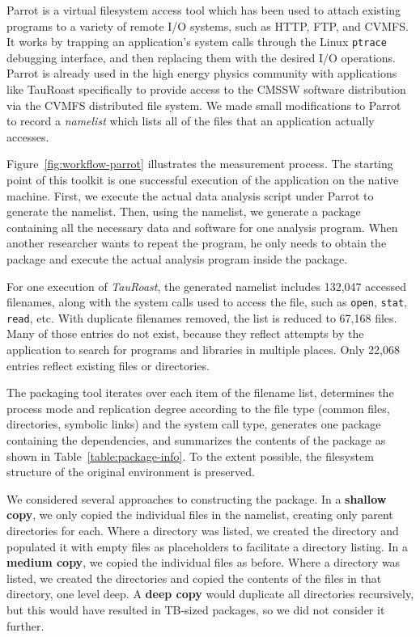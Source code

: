 \documentclass{sig-alternate}
\begin{document}
Parrot is a virtual filesystem access tool which has been used to attach
existing programs to a variety of remote I/O systems, such as HTTP, FTP, and CVMFS.
It works by trapping an application's system calls through the Linux {\tt ptrace} debugging
interface, and then replacing them with the desired I/O operations.  Parrot is already used
in the high energy physics community with applications like TauRoast specifically to 
provide access to the CMSSW software distribution via the CVMFS distributed file system.
We made small modifications to Parrot to record a \emph{namelist} which lists all 
of the files that an application actually accesses.

Figure~\ref{fig:workflow-parrot} illustrates the measurement process.
The starting point of this toolkit is one successful execution of the application on the native machine.
First, we execute the actual data analysis script under Parrot to generate the namelist.
Then, using the namelist, we generate a package containing all the necessary data
and software for one analysis program. When another
researcher wants to repeat the program, he only needs to obtain the package and
execute the actual analysis program inside the package. 

For one execution of \emph{TauRoast}, the generated namelist includes 132,047 accessed filenames,
along with the system calls used to access the file, such as {\tt open}, {\tt stat}, {\tt read}, etc.
With duplicate filenames removed, the list is reduced to 67,168 files.
Many of those entries do not exist, because they reflect attempts
by the application to search for programs and libraries in multiple places.
Only 22,068 entries reflect existing files or directories.

The packaging tool iterates over each item of the filename list, determines the process
mode and replication degree according to the file type (common files,
directories, symbolic links) and the system call type, generates one package
containing the dependencies, and summarizes the contents of the package
as shown in Table~\ref{table:package-info}.  To the extent possible,
the filesystem structure of the original environment is preserved.

We considered several approaches to constructing the package.
In a {\bf shallow copy}, we only copied the individual files in the namelist,
creating only parent directories for each.  Where a directory was listed,
we created the directory and populated it with empty files as placeholders
to facilitate a directory listing.  In a {\bf medium copy}, we copied the
individual files as before.  Where a directory was listed, we created
the directories and copied the contents of the files in that directory,
one level deep.  A {\bf deep copy} would duplicate all directories recursively,
but this would have resulted in TB-sized packages, so we did not consider
it further.
\end{document}
